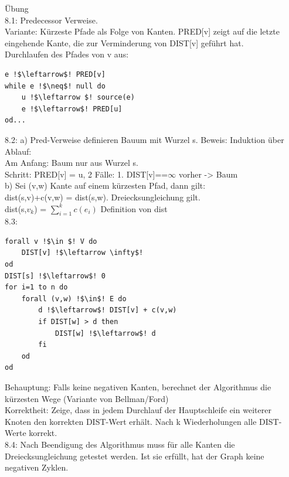 \documentclass[a4paper]{article}
\begin{document}
Übung\\
8.1: Predecessor Verweise.\\
Variante: Kürzeste Pfade als Folge von Kanten. PRED[v] zeigt auf die letzte eingehende Kante, die zur Verminderung von DIST[v] geführt hat.\\
Durchlaufen des Pfades von v aus:
\begin{lstlisting}[escapechar=!]
e !$\leftarrow$! PRED[v]
while e !$\neq$! null do
	u !$\leftarrow $! source(e)
	e !$\leftarrow$! PRED[u]
od...
\end{lstlisting}
8.2: a) Pred-Verweise definieren Bauum mit Wurzel s. Beweis: Induktion über Ablauf:\\
Am Anfang: Baum nur aus Wurzel s.\\
Schritt: PRED[v] = u, 2 Fälle: 1. DIST[v]==$\infty$ vorher -> Baum\\
b) Sei (v,w) Kante auf einem kürzesten Pfad, dann gilt:\\
	dist(s,v)+c(v,w) = dist(s,w). Dreiecksungleichung gilt.\\
	dist(s,$v_k$) = $\sum_{i=1}^k c(e_i)$ Definition von dist\\
8.3: \begin{lstlisting}[escapechar=!]
forall v !$\in $! V do
	DIST[v] !$\leftarrow \infty$! 
od
DIST[s] !$\leftarrow$! 0
for i=1 to n do
	forall (v,w) !$\in$! E do
		d !$\leftarrow$! DIST[v] + c(v,w)
		if DIST[w] > d then
			DIST[w] !$\leftarrow$! d
		fi
	od
od
\end{lstlisting}
Behauptung: Falls keine negativen Kanten, berechnet der Algorithmus die kürzesten Wege (Variante von Bellman/Ford)\\
Korrektheit: Zeige, dass in jedem Durchlauf der Hauptschleife ein weiterer Knoten den korrekten DIST-Wert erhält. Nach k Wiederholungen alle DIST-Werte korrekt.\\
8.4: Nach Beendigung des Algorithmus muss für alle Kanten die Dreiecksungleichung getestet werden. Ist sie erfüllt, hat der Graph keine negativen Zyklen.
\end{document}
